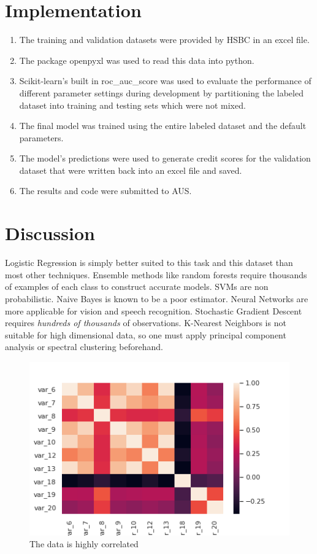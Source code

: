 \documentclass[twocolumn]{article}
\begin{document}
\section*{Implementation}

\begin{enumerate}
	\item The training and validation datasets were provided by HSBC in an excel file.
	\item The package openpyxl was used to read this data into python.
	\item Scikit-learn's built in roc\_auc\_score was used to evaluate the performance of different parameter settings during development by partitioning the labeled dataset into training and testing sets which were not mixed. 
	\item The final model was trained using the entire labeled dataset and the default parameters. 
	\item The model's predictions were used to generate credit scores for the validation dataset that were written back into an excel file and saved.
	\item The results and code were submitted to AUS.
\end{enumerate}

\section*{Discussion}

 Logistic Regression is simply better suited to this task and this dataset than most other techniques. Ensemble methods like random forests require thousands of examples of each class to construct accurate models. SVMs are non probabilistic. Naive Bayes is known to be a poor estimator. Neural Networks are more applicable for vision and speech recognition.  Stochastic Gradient Descent requires \textsl{hundreds of thousands} of observations. K-Nearest Neighbors is not suitable for high dimensional data, so one must apply principal component analysis or spectral clustering beforehand. 

\begin{figure}[h]
	\centering
	\includegraphics[width=\linewidth]{foo.png}
	\caption{The data is highly correlated}
\end{figure}
\end{document}
